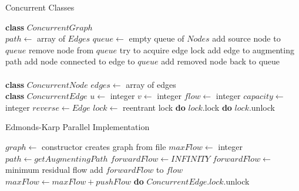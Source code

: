 \clearpage
\begin{algorithm} 
\caption{Concurrent Classes}
\label{EKClasses}
    \begin{algorithmic}[1]
    \State \textbf{class} $ConcurrentGraph$ \\
            \State $path \gets$ array of $Edges$
            \State $queue \gets$ empty queue of $Nodes$
            \State add source node to $queue$
                \State remove node from $queue$
                        \State try to acquire edge lock
                            \State add edge to augmenting path
                            \State add node connected to edge to $queue$
                        \Else
                            \State add removed node back to queue
                        \EndIf
                    \EndIf
                \EndFor
            \EndWhile
        \EndFunction
    \\ \\
    \State \textbf{class} $ConcurrentNode$
        \State $edges\gets$ array of edges
    \\
    \State \textbf{class} $ConcurrentEdge$
        \State $u \gets$ integer
        \State $v \gets$ integer
        \State $flow \gets$ integer
        \State $capacity \gets$ integer
        \State $reverse \gets Edge$
        \State $lock \gets$ reentrant lock
            \State \textbf{do} $lock$.lock
        \EndFunction
            \State \textbf{do} $lock$.unlock
        \EndFunction
    \end{algorithmic}   
\end{algorithm}

\begin{algorithm} 
\caption{Edmonds-Karp Parallel Implementation}
\label{EKP}
    \begin{algorithmic}[1]
        \State $graph \gets$ constructor creates graph from file
        \State $maxFlow \gets$ integer
            \State $path \gets getAugmentingPath$
                \Return
            \Else
                \State $forwardFlow \gets INFINITY$
                    \State $forwardFlow \gets$ minimum residual flow
                \EndFor
                    \State add $forwardFlow$ to $flow$
                \EndFor
                \State $maxFlow \gets maxFlow + pushFlow$
                    \State \textbf{do} $ConcurrentEdge.lock$.unlock
                \EndFor
            \EndIf
        \EndWhile
    \EndFunction
    \end{algorithmic}
\end{algorithm}
\clearpage